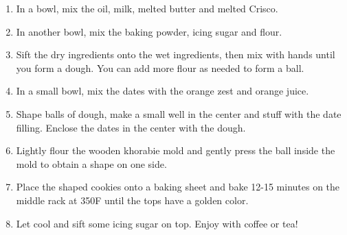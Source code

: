 \begin{enumerate}
    \item In a bowl, mix the oil, milk, melted butter and melted Crisco.
    \item In another bowl, mix the baking powder, icing sugar and flour.
    \item Sift the dry ingredients onto the wet ingredients, then mix with hands until you form a dough. You can add more flour as needed to form a ball.
    \item In a small bowl, mix the dates with the orange zest and orange juice.
    \item Shape balls of dough, make a small well in the center and stuff with the date filling. Enclose the dates in the center with the dough. 
    \item Lightly flour the wooden khorabie mold and gently press the ball inside the mold to obtain a shape on one side.
    \item Place the shaped cookies onto a baking sheet and bake 12-15 minutes on the middle rack at 350\degree F until the tops have a golden color. 
    \item Let cool and sift some icing sugar on top. Enjoy with coffee or tea!
\end{enumerate}